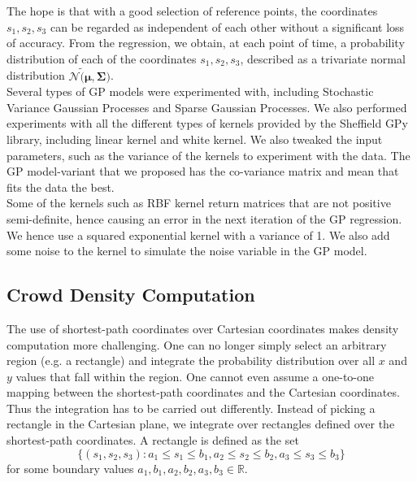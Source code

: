 \documentclass[letterpaper]{article}
\begin{document}
The hope is that with a good selection of reference points, the coordinates $s_1, s_2, s_3$ can be regarded as independent of each other without a significant loss of accuracy. From the regression, we obtain, at each point of time, a probability distribution of each of the coordinates $s_1, s_2, s_3$, described as a trivariate normal distribution $\mathcal{N}\tilde (\boldsymbol{\mu},\boldsymbol{\Sigma})$. \\

Several types of GP models were experimented with, including Stochastic Variance Gaussian Processes and Sparse Gaussian Processes. We also performed experiments with all the different types of kernels provided by the Sheffield GPy library, including linear kernel and white kernel. We also tweaked the input parameters, such as the variance of the kernels to experiment with the data. The GP model-variant that we proposed has the co-variance matrix and mean that fits the data the best. \\ 

Some of the kernels such as RBF kernel return matrices that are not positive semi-definite, hence causing an error in the next iteration of the GP regression. We hence use a squared exponential kernel with a variance of 1. We also add some noise to the kernel to simulate the noise variable in the GP model.

\subsection{Crowd Density Computation}

The use of shortest-path coordinates over Cartesian coordinates makes density computation more challenging. One can no longer simply select an arbitrary region (e.g. a rectangle) and integrate the probability distribution over all $x$ and $y$ values that fall within the region. One cannot even assume a one-to-one mapping between the shortest-path coordinates and the Cartesian coordinates. \\

Thus the integration has to be carried out differently. Instead of picking a rectangle in the Cartesian plane, we integrate over rectangles defined over the shortest-path coordinates. A rectangle is defined as the set
\[\{(s_1,s_2,s_3) : a_1\leq s_1\leq b_1, a_2\leq s_2\leq b_2, a_3\leq s_3\leq b_3\}\]
for some boundary values $a_1,b_1,a_2,b_2,a_3,b_3 \in \mathbb{R}$.\\
\end{document}
